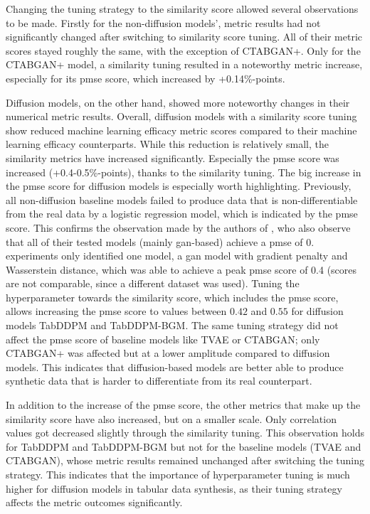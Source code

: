 Changing the tuning strategy to the similarity score allowed several observations to be made.
Firstly for the non-diffusion models', metric results had not significantly changed after switching to similarity score tuning.
All of their metric scores stayed roughly the same, with the exception of CTABGAN+.
Only for the CTABGAN+ model, a similarity tuning resulted in a noteworthy metric increase, especially for its \gls{pmse} score, which increased by +0.14\%-points.

Diffusion models, on the other hand, showed more noteworthy changes in their numerical metric results.
Overall, diffusion models with a similarity score tuning show reduced machine learning efficacy metric scores compared to their machine learning efficacy counterparts.
While this reduction is relatively small, the similarity metrics have increased significantly.
Especially the \gls{pmse} score was increased (+0.4-0.5\%-points), thanks to the similarity tuning.
The big increase in the \gls{pmse} score for diffusion models is especially worth highlighting.
Previously, all non-diffusion baseline models failed to produce data that is non-differentiable from the real data by a logistic regression model, which is indicated by the \gls{pmse} score.
This confirms the observation made by the authors of \cite{chundawat2022UniversalMetricRobust}, who also observe that all of their tested models (mainly \gls{gan}-based) achieve a \gls{pmse} of 0.
\cite{chundawat2022UniversalMetricRobust} experiments only identified one model, a \gls{gan} model with gradient penalty and Wasserstein distance, which was able to achieve a peak \gls{pmse} score of 0.4 (scores are not comparable, since a different dataset was used).
Tuning the hyperparameter towards the similarity score, which includes the \gls{pmse} score, allows increasing the \gls{pmse} score to values between $0.42$ and $0.55$ for diffusion models TabDDPM and TabDDPM-BGM.
The same tuning strategy did not affect the \gls{pmse} score of baseline models like TVAE or CTABGAN; only CTABGAN+ was affected but at a lower amplitude compared to diffusion models.
This indicates that diffusion-based models are better able to produce synthetic data that is harder to differentiate from its real counterpart.

In addition to the increase of the \gls{pmse} score, the other metrics that make up the similarity score have also increased, but on a smaller scale.
Only correlation values got decreased slightly through the similarity tuning.
This observation holds for TabDDPM and TabDDPM-BGM but not for the baseline models (TVAE and CTABGAN), whose metric results remained unchanged after switching the tuning strategy.
This indicates that the importance of hyperparameter tuning is much higher for diffusion models in tabular data synthesis, as their tuning strategy affects the metric outcomes significantly.


